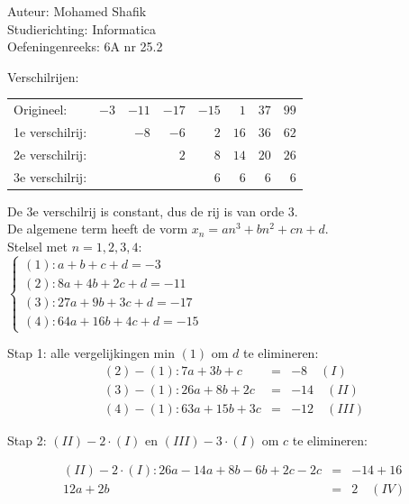 \documentclass[a4paper]{article}
\begin{document}
\noindent \large Auteur: Mohamed Shafik \\
\noindent \large Studierichting: Informatica\\
\noindent \large Oefeningenreeks: 6A nr 25.2\\

\medskip

\normalsize

Verschilrijen:

\begin{tabular}{lrrrrrrr}
Origineel: & $-3$ & $-11$ & $-17$ & $-15$ & $1$ & $37$ & $99$ \\
1e verschilrij: & & $-8$ & $-6$ & $2$ & $16$ & $36$ & $62$ \\
2e verschilrij: & & & $2$ & $8$ & $14$ & $20$ & $26$ \\
3e verschilrij: & & & & $6$ & $6$ & $6$ & $6$
\end{tabular}

De 3e verschilrij is constant, dus de rij is van orde 3.\\

De algemene term heeft de vorm $x_n = an^3 + bn^2 + cn + d$.\\

Stelsel met $n = 1, 2, 3, 4$:\\

$\left\{
\begin{array}{l}
(1):a + b + c + d = -3 \\
(2):8a + 4b + 2c + d = -11 \\
(3):27a + 9b + 3c + d = -17 \\
(4):64a + 16b + 4c + d = -15
\end{array}
\right.$

Stap 1: alle vergelijkingen min $(1)$ om $d$ te elimineren:\\

\begin{eqnarray*}
(2)-(1):7a + 3b + c &=& -8 \quad (I) \\
(3)-(1):26a + 8b + 2c &=& -14 \quad (II) \\
(4)-(1):63a + 15b + 3c &=& -12 \quad (III)
\end{eqnarray*}

Stap 2: $(II) - 2 \cdot (I)$ en $(III) - 3 \cdot (I)$ om $c$ te elimineren:

\begin{eqnarray*}
(II) - 2 \cdot (I):26a - 14a + 8b - 6b + 2c - 2c &=& -14 + 16 \\
12a + 2b &=& 2 \quad (IV)
\end{eqnarray*}
\end{document}
